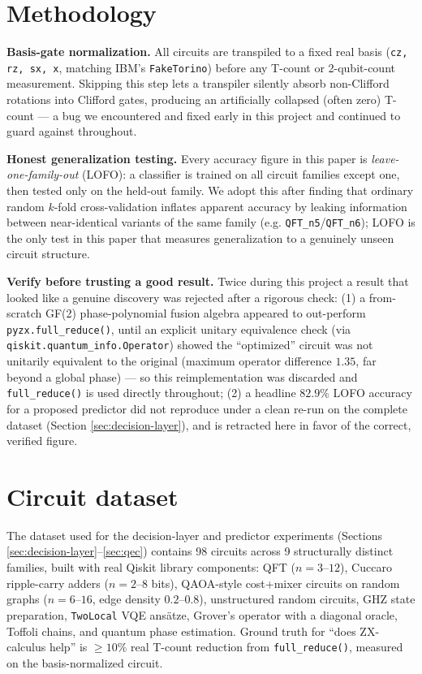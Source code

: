 \documentclass[9pt,twocolumn]{extarticle}
\begin{document}
\section{Methodology}
\textbf{Basis-gate normalization.} All circuits are transpiled to a fixed
real basis (\texttt{cz, rz, sx, x}, matching IBM's \texttt{FakeTorino}) before
any T-count or 2-qubit-count measurement. Skipping this step lets a
transpiler silently absorb non-Clifford rotations into Clifford gates,
producing an artificially collapsed (often zero) T-count --- a bug we
encountered and fixed early in this project and continued to guard against
throughout.

\textbf{Honest generalization testing.} Every accuracy figure in this paper
is \emph{leave-one-family-out} (LOFO): a classifier is trained on all
circuit families except one, then tested only on the held-out family. We
adopt this after finding that ordinary random $k$-fold cross-validation
inflates apparent accuracy by leaking information between near-identical
variants of the same family (e.g. \texttt{QFT\_n5}/\texttt{QFT\_n6}); LOFO is
the only test in this paper that measures generalization to a genuinely
unseen circuit structure.

\textbf{Verify before trusting a good result.} Twice during this project a
result that looked like a genuine discovery was rejected after a rigorous
check: (1) a from-scratch GF(2) phase-polynomial fusion algebra appeared to
out-perform \texttt{pyzx.full\_reduce()}, until an explicit unitary
equivalence check (via \texttt{qiskit.quantum\_info.Operator}) showed the
``optimized'' circuit was not unitarily equivalent to the original (maximum
operator difference $1.35$, far beyond a global phase) --- so this
reimplementation was discarded and \texttt{full\_reduce()} is used directly
throughout; (2) a headline $82.9\%$ LOFO accuracy for a proposed predictor
did not reproduce under a clean re-run on the complete dataset (Section
\ref{sec:decision-layer}), and is retracted here in favor of the correct,
verified figure.

\section{Circuit dataset}
The dataset used for the decision-layer and predictor experiments (Sections
\ref{sec:decision-layer}--\ref{sec:qec}) contains 98 circuits across 9
structurally distinct families, built with real Qiskit library components:
QFT ($n=3$--$12$), Cuccaro ripple-carry adders ($n=2$--$8$ bits), QAOA-style
cost+mixer circuits on random graphs ($n=6$--$16$, edge density
$0.2$--$0.8$), unstructured random circuits, GHZ state preparation,
\texttt{TwoLocal} VQE ans\"atze, Grover's operator with a diagonal oracle,
Toffoli chains, and quantum phase estimation. Ground truth for ``does
ZX-calculus help'' is $\ge 10\%$ real T-count reduction from
\texttt{full\_reduce()}, measured on the basis-normalized circuit.
\end{document}
